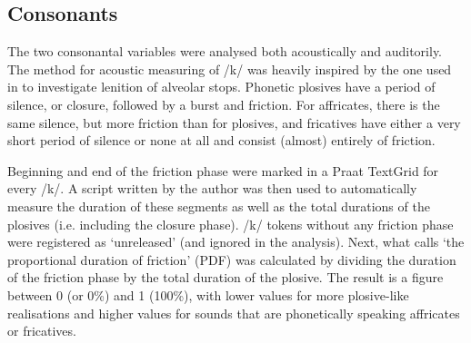 		\subsection{Consonants}\label{sec.prod_method.con}

The two consonantal variables were analysed both acoustically and auditorily.
The method for acoustic measuring of /k/ was heavily inspired by the one used in \citealt{sangster2001} to investigate lenition of alveolar stops. Phonetic plosives have a period of silence, or closure, followed by a burst and friction. For affricates, there is the same silence, but more friction than for plosives, and fricatives have either a very short period of silence or none at all and consist (almost) entirely of friction. 

Beginning and end of the friction phase were marked in a Praat TextGrid for every /k/. 
A script written by the author was then used to automatically measure the duration of these segments as well as the total durations of the plosives (i.e. including the closure phase).
/k/ tokens without any friction phase were registered as `unreleased' (and ignored in the analysis).
Next, what \citeauthor{sangster2001} calls `the proportional duration of friction' (PDF) was calculated by dividing the duration of the friction phase by the total duration of the plosive. The result is a figure between 0 (or 0\%) and 1 (100\%), with lower values for more plosive-like realisations and higher values for sounds that are phonetically speaking affricates or fricatives.

